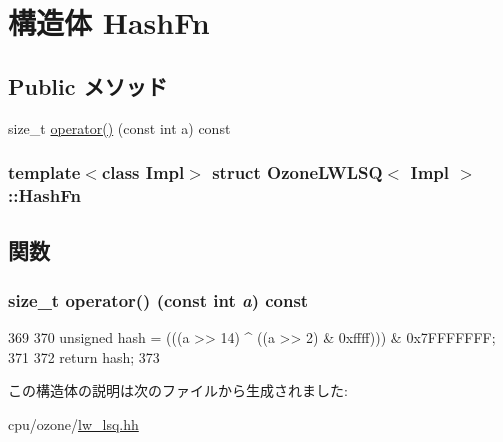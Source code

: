 \hypertarget{structOzoneLWLSQ_1_1HashFn}{
\section{構造体 HashFn}
\label{structOzoneLWLSQ_1_1HashFn}
}
\subsection*{Public メソッド}
\begin{DoxyCompactItemize}
\item 
size\_\-t \hyperlink{structOzoneLWLSQ_1_1HashFn_a4a917ffce70d71fb2df730f42d4ebfdb}{operator()} (const int a) const 
\end{DoxyCompactItemize}
\subsubsection*{template$<$class Impl$>$ struct OzoneLWLSQ$<$ Impl $>$::HashFn}



\subsection{関数}
\hypertarget{structOzoneLWLSQ_1_1HashFn_a4a917ffce70d71fb2df730f42d4ebfdb}{
\subsubsection[{operator()}]{\setlength{\rightskip}{0pt plus 5cm}size\_\-t operator() (const int {\em a}) const}}
\label{structOzoneLWLSQ_1_1HashFn_a4a917ffce70d71fb2df730f42d4ebfdb}



\begin{DoxyCode}
369     {
370         unsigned hash = (((a >> 14) ^ ((a >> 2) & 0xffff))) & 0x7FFFFFFF;
371 
372         return hash;
373     }
\end{DoxyCode}


この構造体の説明は次のファイルから生成されました:\begin{DoxyCompactItemize}
\item 
cpu/ozone/\hyperlink{lw__lsq_8hh}{lw\_\-lsq.hh}\end{DoxyCompactItemize}
